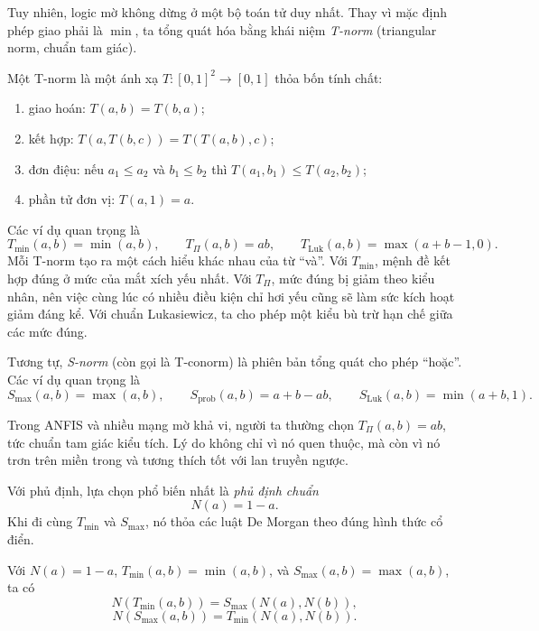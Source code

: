 Tuy nhiên, logic mờ không dừng ở một bộ toán tử duy nhất. Thay vì mặc định phép giao phải là \(\min\), ta tổng quát hóa bằng khái niệm \emph{T-norm} (triangular norm, chuẩn tam giác).

\begin{definition}
Một T-norm là một ánh xạ \(T:[0,1]^2\to[0,1]\) thỏa bốn tính chất:
\begin{enumerate}
\item giao hoán: \(T(a,b)=T(b,a)\);
\item kết hợp: \(T(a,T(b,c))=T(T(a,b),c)\);
\item đơn điệu: nếu \(a_1\le a_2\) và \(b_1\le b_2\) thì \(T(a_1,b_1)\le T(a_2,b_2)\);
\item phần tử đơn vị: \(T(a,1)=a\).
\end{enumerate}
\end{definition}

Các ví dụ quan trọng là
\[
T_{\min}(a,b)=\min(a,b),
\qquad
T_{\Pi}(a,b)=ab,
\qquad
T_{\mathrm{Luk}}(a,b)=\max(a+b-1,0).
\]
Mỗi T-norm tạo ra một cách hiểu khác nhau của từ ``và''. Với \(T_{\min}\), mệnh đề kết hợp đúng ở mức của mắt xích yếu nhất. Với \(T_{\Pi}\), mức đúng bị giảm theo kiểu nhân, nên việc cùng lúc có nhiều điều kiện chỉ hơi yếu cũng sẽ làm sức kích hoạt giảm đáng kể. Với chuẩn Lukasiewicz, ta cho phép một kiểu bù trừ hạn chế giữa các mức đúng.

Tương tự, \emph{S-norm} (còn gọi là T-conorm) là phiên bản tổng quát cho phép ``hoặc''. Các ví dụ quan trọng là
\[
S_{\max}(a,b)=\max(a,b),
\qquad
S_{\mathrm{prob}}(a,b)=a+b-ab,
\qquad
S_{\mathrm{Luk}}(a,b)=\min(a+b,1).
\]

\begin{remark}
Trong ANFIS và nhiều mạng mờ khả vi, người ta thường chọn \(T_{\Pi}(a,b)=ab\), tức chuẩn tam giác kiểu tích. Lý do không chỉ vì nó quen thuộc, mà còn vì nó trơn trên miền trong và tương thích tốt với lan truyền ngược.
\end{remark}

Với phủ định, lựa chọn phổ biến nhất là \emph{phủ định chuẩn}
\[
N(a)=1-a.
\]
Khi đi cùng \(T_{\min}\) và \(S_{\max}\), nó thỏa các luật De Morgan theo đúng hình thức cổ điển.

\begin{proposition}
Với \(N(a)=1-a\), \(T_{\min}(a,b)=\min(a,b)\), và \(S_{\max}(a,b)=\max(a,b)\), ta có
\[
N(T_{\min}(a,b))=S_{\max}(N(a),N(b)),
\]
\[
N(S_{\max}(a,b))=T_{\min}(N(a),N(b)).
\]
\end{proposition}


